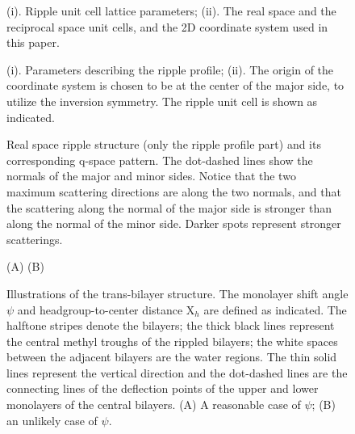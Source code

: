 \begin{figure}
\centerline {}
\vspace{11pt}
\caption{(i). Ripple unit cell lattice parameters; (ii). The real space and
the reciprocal space unit cells, and the 2D coordinate system used in this 
paper.
\label{unitcells}}
\end{figure}

\pagebreak

\begin{figure}
\centerline {}
\vspace{11pt}
\caption{(i). Parameters describing the ripple profile; (ii). 
The origin of the coordinate system is chosen to be at the center
of the major side, to utilize the inversion symmetry. The ripple unit
cell is shown as indicated.
\label{rppl_profile}}
\end{figure}

\pagebreak

\begin{figure}
\centerline {}
\vspace{11pt}
\caption{Real space ripple structure (only the ripple profile part) and its 
corresponding q-space pattern. The dot-dashed lines show the normals
of the major and minor sides. Notice that the two maximum
scattering directions are along the two normals, and that
the scattering along the normal of the major side is stronger than
along the normal of the minor side. Darker spots represent stronger
scatterings.
\label{q_pattern}}
\end{figure}

\pagebreak

\begin{figure}
\begin{center}
\leavevmode
\raggedleft 
\hspace{0.2in}
\leavevmode
\raggedright 
\hspace{0.3in}
\end{center}
\vspace{-0.2in}
\hspace{1.5in} (A) \hspace{2.9in} (B)
\vspace{0.2in}
\caption{Illustrations of the trans-bilayer structure. The monolayer
shift angle $\psi$ and headgroup-to-center distance X$_h$ are defined as
indicated. The halftone stripes denote the bilayers; the thick black lines 
represent the central methyl troughs of the rippled bilayers; the white spaces
between the adjacent bilayers are the water regions. The thin solid
lines represent the vertical direction and the dot-dashed lines are the
connecting lines of the deflection points of the upper and lower monolayers
of the central bilayers. (A) A reasonable case of $\psi$; (B) an unlikely case 
of $\psi$.
\label{trans}}
\end{figure}

